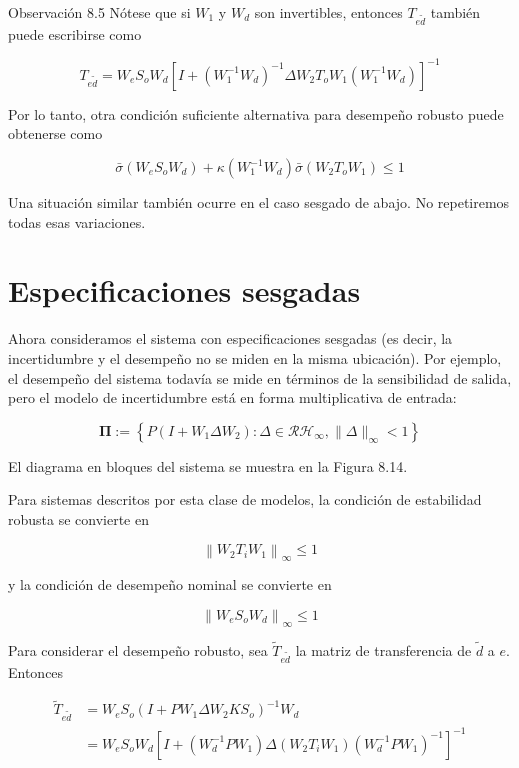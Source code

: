 Observación 8.5 Nótese que si $W_{1}$ y $W_{d}$ son invertibles, entonces $T_{e \tilde{d}}$ también puede escribirse como

$$
T_{e \tilde{d}}=W_{e} S_{o} W_{d}\left[I+\left(W_{1}^{-1} W_{d}\right)^{-1} \Delta W_{2} T_{o} W_{1}\left(W_{1}^{-1} W_{d}\right)\right]^{-1}
$$

Por lo tanto, otra condición suficiente alternativa para desempeño robusto puede obtenerse como

$$
\bar{\sigma}\left(W_{e} S_{o} W_{d}\right)+\kappa\left(W_{1}^{-1} W_{d}\right) \bar{\sigma}\left(W_{2} T_{o} W_{1}\right) \leq 1
$$

Una situación similar también ocurre en el caso sesgado de abajo. No repetiremos todas esas variaciones.

\section{Especificaciones sesgadas}
Ahora consideramos el sistema con especificaciones sesgadas (es decir, la incertidumbre y el desempeño no se miden en la misma ubicación). Por ejemplo, el desempeño del sistema todavía se mide en términos de la sensibilidad de salida, pero el modelo de incertidumbre está en forma multiplicativa de entrada:

$$
\boldsymbol{\Pi}:=\left\{P\left(I+W_{1} \Delta W_{2}\right): \Delta \in \mathcal{R} \mathcal{H}_{\infty},\|\Delta\|_{\infty}<1\right\}
$$


El diagrama en bloques del sistema se muestra en la Figura 8.14.

Para sistemas descritos por esta clase de modelos, la condición de estabilidad robusta se convierte en

$$
\left\|W_{2} T_{i} W_{1}\right\|_{\infty} \leq 1
$$

y la condición de desempeño nominal se convierte en

$$
\left\|W_{e} S_{o} W_{d}\right\|_{\infty} \leq 1
$$

Para considerar el desempeño robusto, sea $\tilde{T}_{e \tilde{d}}$ la matriz de transferencia de $\tilde{d}$ a $e$. Entonces

$$
\begin{aligned}
\tilde{T}_{e \tilde{d}} & =W_{e} S_{o}\left(I+P W_{1} \Delta W_{2} K S_{o}\right)^{-1} W_{d} \\
& =W_{e} S_{o} W_{d}\left[I+\left(W_{d}^{-1} P W_{1}\right) \Delta\left(W_{2} T_{i} W_{1}\right)\left(W_{d}^{-1} P W_{1}\right)^{-1}\right]^{-1}
\end{aligned}
$$

